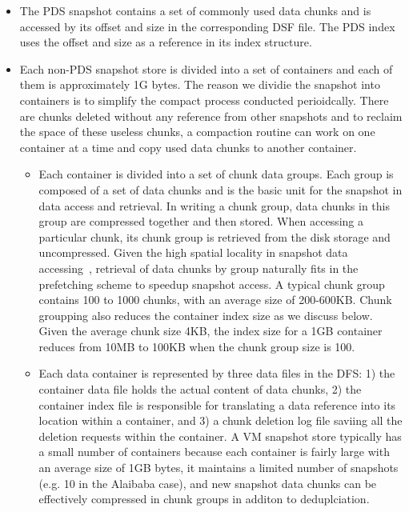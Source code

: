\begin{itemize}
\item The PDS snapshot contains a set of commonly used data chunks and is accessed by its offset and size
in the corresponding DSF file.
The PDS index uses the offset and size as a reference in its index structure.
 
\item Each non-PDS snapshot store is divided into a set of containers and each of them is approximately 
1G bytes. The reason we dividie the snapshot into containers is to simplify the compact process
conducted perioidcally.  There are chunks deleted without any reference from other snapshots
and to reclaim the space of these useless chunks, a compaction  routine can work on one container at a time
and copy used data chunks to another container.
	\begin{itemize}
	\item Each container is divided into a set of chunk data groups. Each group is composed of
	a set of data chunks and is the basic unit for the snapshot in data access and retrieval. 
	In writing a chunk group, data chunks in this group are compressed together and then stored. 
	When accessing a particular chunk, its chunk group is retrieved from the disk storage
	and uncompressed. Given the high spatial locality 
in snapshot data accessing~\cite{Sampling,FoundationPaper},
	retrieval of  data chunks by group naturally fits in the prefetching scheme  to speedup
	snapshot access. A  typical chunk group contains 100 to 1000 chunks, with an average size of 
200-600KB.
Chunk groupping also reduces the  container index size as we discuss below. 
Given  the average chunk size  4KB,  the index size for a 1GB container reduces from 10MB to 100KB when
the chunk group size is 100.
	\item 
Each data container is represented by three data files in the DFS:
1) the container data file holds the actual content of data chunks, 
2) the container index file is responsible for translating a data reference
into its location within a container, and 
3) a chunk deletion log file saviing all the deletion requests within  the container.
A VM snapshot store typically has a small number of containers because each container is fairly large with an average size of 1GB bytes, it 
maintains a limited number of snapshots (e.g. 10 in the Alaibaba case),
and new snapshot data chunks can be effectively compressed in chunk groups in additon to  deduplciation.


\end{itemize}
\end{itemize}
